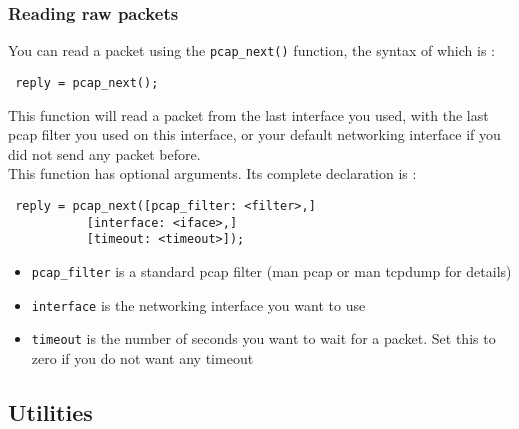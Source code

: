\documentclass{article}
\begin{document}
\subsubsection{Reading raw packets}

You can read a packet using the \verb+pcap_next()+ function, the syntax
of which is :
\begin{verbatim}
 reply = pcap_next();
\end{verbatim}

This function will read a packet from the last interface you used, with
the last pcap filter you used on this interface, or your default networking interface if you did not send any packet before. \\
This function has optional arguments. Its complete declaration is :
\begin{verbatim}
 reply = pcap_next([pcap_filter: <filter>,]
	 	   [interface: <iface>,]
	 	   [timeout: <timeout>]);
\end{verbatim}

\begin{itemize}
\item \verb+pcap_filter+ is a standard pcap filter (man pcap or man tcpdump for details)
\item \verb+interface+ is the networking interface you want to use
\item \verb+timeout+ is the number of seconds you want to wait for a packet. Set this to zero if you do not want any timeout
\end{itemize}

\subsection{Utilities}
\end{document}
